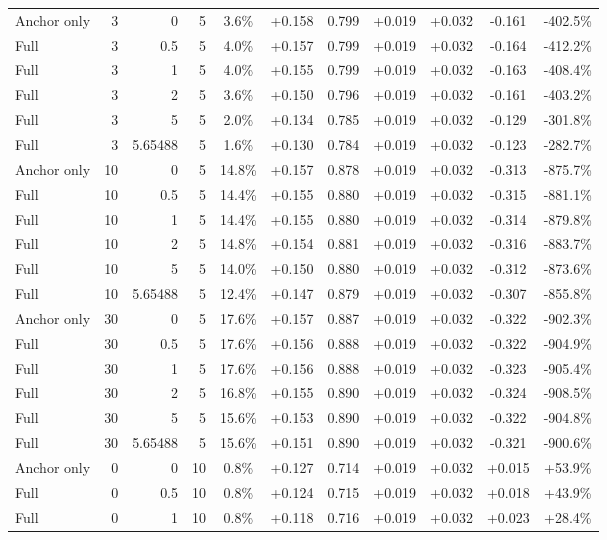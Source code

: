\begin{table}[htbp]
\begin{tabular}{lrrrccccccc}
Anchor only & 3 & 0 & 5 & 3.6\% & +0.158 & 0.799 & +0.019 & +0.032 & -0.161 & -402.5\% \\
Full & 3 & 0.5 & 5 & 4.0\% & +0.157 & 0.799 & +0.019 & +0.032 & -0.164 & -412.2\% \\
Full & 3 & 1 & 5 & 4.0\% & +0.155 & 0.799 & +0.019 & +0.032 & -0.163 & -408.4\% \\
Full & 3 & 2 & 5 & 3.6\% & +0.150 & 0.796 & +0.019 & +0.032 & -0.161 & -403.2\% \\
Full & 3 & 5 & 5 & 2.0\% & +0.134 & 0.785 & +0.019 & +0.032 & -0.129 & -301.8\% \\
Full & 3 & 5.65488 & 5 & 1.6\% & +0.130 & 0.784 & +0.019 & +0.032 & -0.123 & -282.7\% \\
Anchor only & 10 & 0 & 5 & 14.8\% & +0.157 & 0.878 & +0.019 & +0.032 & -0.313 & -875.7\% \\
Full & 10 & 0.5 & 5 & 14.4\% & +0.155 & 0.880 & +0.019 & +0.032 & -0.315 & -881.1\% \\
Full & 10 & 1 & 5 & 14.4\% & +0.155 & 0.880 & +0.019 & +0.032 & -0.314 & -879.8\% \\
Full & 10 & 2 & 5 & 14.8\% & +0.154 & 0.881 & +0.019 & +0.032 & -0.316 & -883.7\% \\
Full & 10 & 5 & 5 & 14.0\% & +0.150 & 0.880 & +0.019 & +0.032 & -0.312 & -873.6\% \\
Full & 10 & 5.65488 & 5 & 12.4\% & +0.147 & 0.879 & +0.019 & +0.032 & -0.307 & -855.8\% \\
Anchor only & 30 & 0 & 5 & 17.6\% & +0.157 & 0.887 & +0.019 & +0.032 & -0.322 & -902.3\% \\
Full & 30 & 0.5 & 5 & 17.6\% & +0.156 & 0.888 & +0.019 & +0.032 & -0.322 & -904.9\% \\
Full & 30 & 1 & 5 & 17.6\% & +0.156 & 0.888 & +0.019 & +0.032 & -0.323 & -905.4\% \\
Full & 30 & 2 & 5 & 16.8\% & +0.155 & 0.890 & +0.019 & +0.032 & -0.324 & -908.5\% \\
Full & 30 & 5 & 5 & 15.6\% & +0.153 & 0.890 & +0.019 & +0.032 & -0.322 & -904.8\% \\
Full & 30 & 5.65488 & 5 & 15.6\% & +0.151 & 0.890 & +0.019 & +0.032 & -0.321 & -900.6\% \\
Anchor only & 0 & 0 & 10 & 0.8\% & +0.127 & 0.714 & +0.019 & +0.032 & +0.015 & +53.9\% \\
Full & 0 & 0.5 & 10 & 0.8\% & +0.124 & 0.715 & +0.019 & +0.032 & +0.018 & +43.9\% \\
Full & 0 & 1 & 10 & 0.8\% & +0.118 & 0.716 & +0.019 & +0.032 & +0.023 & +28.4\% \\

\end{tabular}
\end{table}
